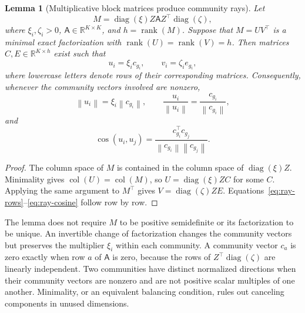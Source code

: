 \documentclass[aps,pre,reprint,superscriptaddress,longbibliography]{revtex4-2}
\newcommand{\R}{\mathbb{R}}
\newcommand{\norm}[1]{\left\lVert #1 \right\rVert}
\DeclareMathOperator{\diag}{diag}
\DeclareMathOperator{\rank}{rank}
\DeclareMathOperator{\col}{col}
\newtheorem{lemma}[theorem]{Lemma}
\begin{document}
\begin{lemma}[Multiplicative block matrices produce community rays]
\label{lem:multiplicative-rays}
Let
\begin{equation}
    M=\diag(\xi)Z\mathsf{A} Z^\top\diag(\zeta),
    \label{eq:general-multiplicative}
\end{equation}
where \(\xi_i,\zeta_i>0\), \(\mathsf{A}\in\R^{K\times K}\), and \(h=\rank(M)\).
Suppose that \(M=UV^\top\) is a minimal exact factorization with
\(\rank(U)=\rank(V)=h\).
Then matrices \(C,E\in\R^{K\times h}\) exist such that
\begin{equation}
    u_i=\xi_i c_{g_i},
    \qquad
    v_i=\zeta_i e_{g_i},
    \label{eq:ray-rows}
\end{equation}
where lowercase letters denote rows of their corresponding matrices.
Consequently, whenever the community vectors involved are nonzero,
\begin{equation}
    \norm{u_i}=\xi_i\norm{c_{g_i}},
    \qquad
    \frac{u_i}{\norm{u_i}}
    =
    \frac{c_{g_i}}{\norm{c_{g_i}}},
    \label{eq:ray-norm-direction}
\end{equation}
and
\begin{equation}
    \cos(u_i,u_j)
    =
    \frac{c_{g_i}^\top c_{g_j}}
    {\norm{c_{g_i}}\norm{c_{g_j}}}.
    \label{eq:ray-cosine}
\end{equation}
\end{lemma}

\begin{proof}
The column space of \(M\) is contained in the column space of \(\diag(\xi)Z\).
Minimality gives \(\col(U)=\col(M)\), so \(U=\diag(\xi)ZC\) for some \(C\).
Applying the same argument to \(M^\top\) gives \(V=\diag(\zeta)ZE\).
Equations~\eqref{eq:ray-rows}--\eqref{eq:ray-cosine} follow row by row.
\end{proof}

The lemma does not require \(M\) to be positive semidefinite or its factorization to be unique.
An invertible change of factorization changes the community vectors but preserves the multiplier \(\xi_i\) within each community.
A community vector \(c_a\) is zero exactly when row \(a\) of \(\mathsf{A}\) is zero, because the rows of \(Z^\top\diag(\zeta)\) are linearly independent.
Two communities have distinct normalized directions when their community vectors are nonzero and are not positive scalar multiples of one another.
Minimality, or an equivalent balancing condition, rules out canceling components in unused dimensions.
\end{document}
